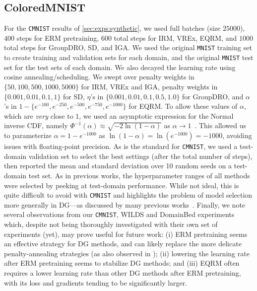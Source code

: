 \documentclass{article}
\begin{document}
\subsection{ColoredMNIST}%
\label{sec:impl_details:cmnist}%
For the \texttt{CMNIST} results of \cref{sec:exps:synthetic}, we used full batches (size $25000$), $400$ steps for ERM pretraining, $600$ total steps for IRM, VREx, EQRM, and $1000$ total steps for GroupDRO, SD, and IGA. We used the original \texttt{MNIST} training set to create training and validation sets for each domain, and the original \texttt{MNIST} test set for the test sets of each domain. We also decayed the learning rate using cosine annealing/scheduling. We swept over penalty weights in $\{50, 100, 500, 1000, 5000\}$ for IRM, VREx and IGA, penalty weights in $\{0.001, 0.01, 0.1, 1\}$ for SD, $\eta$'s in $\{0.001, 0.01, 0.1, 0.5, 1.0\}$ for GroupDRO, and $\alpha$'s in $1 - \{e^{-100}, e^{-250}, e^{-500}, e^{-750}, e^{-1000}\}$ for EQRM. To allow these values of $\alpha$, which are \emph{very} close to 1, we used an asymptotic expression for the Normal inverse CDF, namely $\Phi^{-1}(\alpha) \approx \sqrt{-2 \ln (1 - \alpha)}$ as $\alpha \to 1$~\citep{blair1976rational}. This allowed us to parameterize $\alpha = 1 - e^{-1000}$ as $\ln (1 - \alpha) = \ln (e^{-1000})= -1000$, avoiding issues with floating-point precision. As is the standard for \texttt{CMNIST}, we used a test-domain validation set to select the best settings (after the total number of steps), then reported the mean and standard deviation over 10 random seeds on a test-domain test set. As in previous works, the hyperparameter ranges of all methods were selected by peeking at test-domain performance. While not ideal, this is quite difficult to avoid with \texttt{CMNIST} and highlights the problem of model selection more generally in DG---as discussed by many previous works~\citep{arjovsky2020invariant, krueger21rex, gulrajani2020search, zhang2022rich}. Finally, we note several observations from our \texttt{CMNIST}, WILDS and DomainBed experiments which, despite not being thoroughly investigated with their own set of experiments (yet), may prove useful for future work: (i) ERM pretraining seems an effective strategy for DG methods, and can likely replace the more delicate penalty-annealing strategies (as also observed in \citep{zhang2022rich}); (ii) lowering the learning rate after ERM pretraining seems to stabilize DG methods; and (iii) EQRM often requires a lower learning rate than other DG methods after ERM pretraining, with its loss and gradients tending to be significantly larger.
\end{document}
